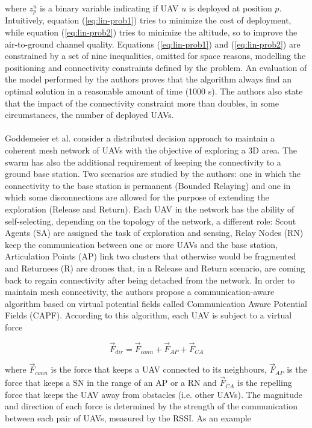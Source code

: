 where $z_p^u$ is a binary variable indicating if \gls{UAV} $u$ is deployed at position $p$. Intuitively, equation (\ref{eq:lin-prob1}) tries to minimize the cost of deployment, while equation (\ref{eq:lin-prob2}) tries to minimize the altitude, so to improve the air-to-ground channel quality. 
Equations (\ref{eq:lin-prob1}) and (\ref{eq:lin-prob2}) are constrained by a set of nine inequalities, omitted for space reasons, modelling the positioning and connectivity constraints defined by the problem. An evaluation of the model performed by the authors proves that the algorithm always find an optimal solution in a reasonable amount of time (1000 s). The authors also state that the impact of the connectivity constraint more than doubles, in some circumstances, the number of deployed \glspl{UAV}. \\ \\
Goddemeier et al. \cite{ref:soa-plac-pf} consider a distributed decision approach to maintain a coherent mesh network of \glspl{UAV} with the objective of exploring a 3D area. The swarm has also the additional requirement of keeping the connectivity to a ground base station. Two scenarios are studied by the authors: one in which the connectivity to the base station is permanent (Bounded Relaying) and one in which some disconnections are allowed for the purpose of extending the exploration (Release and Return). Each \gls{UAV} in the network has the ability of self-selecting, depending on the topology of the network, a different role: Scout Agents (SA) are assigned the task of exploration and sensing, Relay Nodes (RN) keep the communication between one or more \glspl{UAV} and the base station, Articulation Points (AP) link two clusters that otherwise would be fragmented and Returnees (R) are drones that, in a Release and Return scenario, are coming back to regain connectivity after being detached from the network. In order to maintain mesh connectivity, the authors propose a communication-aware algorithm based on virtual potential fields called Communication Aware Potential Fields (CAPF). According to this algorithm, each \gls{UAV} is subject to a virtual force

\begin{equation}
 \overrightarrow{F}_{dir} = \overrightarrow{F}_{conn} + \overrightarrow{F}_{AP} + \overrightarrow{F}_{CA} 
\end{equation} 

where $\overrightarrow{F}_{conn}$ is the force that keeps a \gls{UAV} connected to its neighbours, $\overrightarrow{F}_{AP}$ is the force that keeps a SN in the range of an AP or a RN and $\overrightarrow{F}_{CA}$ is the repelling force that keeps the \gls{UAV} away from obstacles (i.e. other \glspl{UAV}). The magnitude and direction of each force is determined by the strength of the communication between each pair of \glspl{UAV}, measured by the RSSI. As an example

